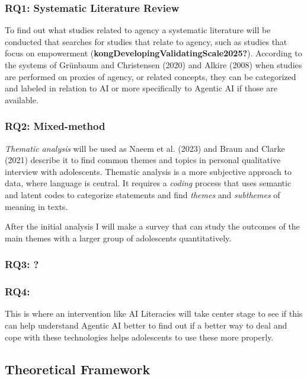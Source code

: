 \documentclass[
  letterpaper,
  DIV=11,
  numbers=noendperiod]{scrartcl}
\begin{document}
\subsubsection{RQ1: Systematic Literature
Review}\label{rq1-systematic-literature-review}

To find out what studies related to agency a systematic literature will
be conducted that searches for studies that relate to agency, such as
studies that focus on empowerment
(\textbf{kongDevelopingValidatingScale2025?}). According to the systems
of Grünbaum and Christensen (2020) and Alkire (2008) when studies are
performed on proxies of agency, or related concepts, they can be
categorized and labeled in relation to AI or more specifically to
Agentic AI if those are available.

\subsubsection{RQ2: Mixed-method}\label{rq2-mixed-method}

\emph{Thematic analysis} will be used as Naeem et al. (2023) and Braun
and Clarke (2021) describe it to find common themes and topics in
personal qualitative interview with adolescents. Thematic analysis is a
more subjective approach to data, where language is central. It requires
a \emph{coding} process that uses semantic and latent codes to
categorize statements and find \emph{themes} and \emph{subthemes} of
meaning in texts.

After the initial analysis I will make a survey that can study the
outcomes of the main themes with a larger group of adolescents
quantitatively.

\subsubsection{RQ3: ?}\label{rq3}

\subsubsection{RQ4:}\label{rq4}

This is where an intervention like AI Literacies will take center stage
to see if this can help understand Agentic AI better to find out if a
better way to deal and cope with these technologies helps adolescents to
use these more properly.

\subsection{Theoretical Framework}\label{theoretical-framework}
\end{document}
